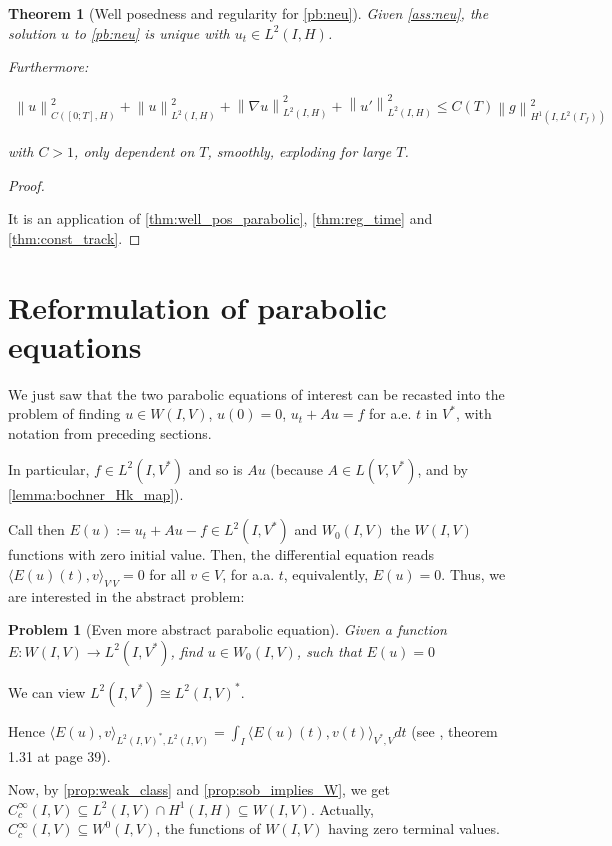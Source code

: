 \documentclass[english,a4paper,12pt,oneside]{scrbook}
\theoremstyle{break}
\newtheorem{thm}[equation]{Theorem}
\newtheorem{pb}[equation]{Problem}
\newenvironment{mproof}[1][\proofname]{%
  \begin{proof}[#1]$ $\par\nobreak\ignorespaces
}{%
  \end{proof}
}
\renewcommand*{\proofname}{Proof}
\theoremstyle{remark}
\newcommand{\norm}[1]{\left\lVert#1\right\rVert}
\begin{document}
\begin{thm}[Well posedness and regularity for \cref{pb:neu}]
Given \cref{ass:neu}, the solution $u$ to \cref{pb:neu} is unique with $u_t \in L^2(I,H)$.

Furthermore: 

\begin{align}
\norm{u}^2_{C([0;T],H)}+\norm{u}_{L^2(I,H)}^2+ \norm{\nabla u}_{L^2(I,H)}^2 + \norm{u'}^2_{L^2(I,H)}\leq C(T)\norm{g}_{H^1(I,L^2(\Gamma_f))}^2
\end{align}

with $C>1$, only dependent on $T$, smoothly, exploding for large $T$.
\end{thm}
\begin{mproof}

It is an application of \cref{thm:well_pos_parabolic}, \cref{thm:reg_time} and \cref{thm:const_track}.
\end{mproof}

\section{Reformulation of parabolic equations}

We just saw that the two parabolic equations of interest can be recasted into the problem of finding $u\in W(I,V)$, $u(0)=0$, $u_t+Au=f$ for a.e. $t$ in $V^*$, with notation from preceding sections.

In particular, $f \in L^2(I, V^*)$ and so is $Au$ (because $A\in L(V,V^*)$, and by \ref{lemma:bochner_Hk_map}).

Call then $E(u):=u_t+Au-f \in L^2(I,V^*)$ and $W_0(I,V)$ the $W(I,V)$ functions with zero initial value. Then, the differential equation reads $\langle E(u)(t),v\rangle_{V^,V}=0$ for all $v\in V$, for a.a. $t$, equivalently, $E(u)=0$. Thus, we are interested in the abstract problem:

\begin{pb}[Even more abstract parabolic equation]
\label{pb:more_abstr_par}
Given a function $E: W(I,V)\rightarrow L^2(I,V^*)$, find $u\in W_0(I,V)$, such that $E(u)=0$
\end{pb}
 
We can view $L^2(I,V^*)\cong L^2(I,V)^*$.

Hence $\langle E(u), v\rangle_{L^2(I,V)^*, L^2(I,V)}=\int_I \langle E(u)(t),v(t) \rangle_{V^*,V} dt$ (see \cite{hinze}, theorem 1.31 at page 39).

Now, by \cref{prop:weak_class} and \ref{prop:sob_implies_W}, we get $C_c^\infty(I,V) \subseteq L^2(I,V)\cap H^1(I,H) \subseteq W(I,V)$. Actually, $C_c^\infty(I,V) \subseteq  W^0(I,V)$, the functions of $W(I,V)$ having zero terminal values.
\end{document}

